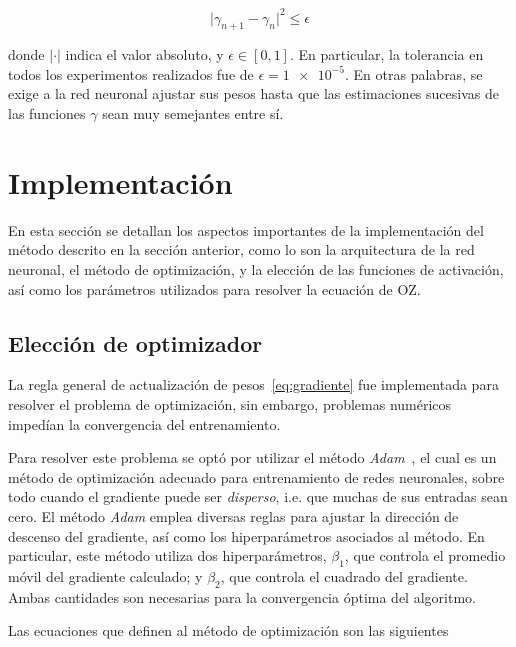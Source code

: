 \begin{equation}
    {\lvert \gamma_{n+1} - \gamma_{n} \rvert}^2 \leq \epsilon
    \label{eq:tolerancia}
\end{equation}

donde $\lvert \cdot \rvert$ indica el valor absoluto, y $\epsilon \in [0, 1]$.
En particular, la tolerancia en todos los experimentos realizados fue de
$\epsilon = \num{1e-5}$.
En otras palabras, se exige a la red neuronal ajustar sus pesos hasta que las estimaciones
sucesivas de las funciones $\gamma$ sean muy semejantes entre sí.

\section{Implementación}
En esta sección se detallan los aspectos importantes de la implementación del método
descrito en la sección anterior, como lo son la arquitectura de la red neuronal, el método
de optimización, y la elección de las funciones de activación, así como los parámetros
utilizados para resolver la ecuación de OZ.

\subsection{Elección de optimizador}
La regla general de actualización de pesos~\eqref{eq:gradiente} fue implementada para 
resolver el problema de optimización, sin embargo, problemas numéricos impedían la
convergencia del entrenamiento.

Para resolver este problema se optó por utilizar el método \emph{Adam}~\cite{kingmaAdamMethodStochastic2017},
el cual es un método de optimización adecuado para entrenamiento de redes neuronales,
sobre todo cuando el gradiente puede ser \emph{disperso}, i.e. que muchas de sus entradas
sean cero.
El método \emph{Adam} emplea diversas reglas para ajustar la dirección de descenso del
gradiente, así como los hiperparámetros asociados al método. En particular, este método
utiliza dos hiperparámetros, $\beta_1$, que controla el promedio móvil
del gradiente calculado; y $\beta_2$, que controla el cuadrado del gradiente. Ambas
cantidades son necesarias para la convergencia óptima del algoritmo.

Las ecuaciones que definen al método de optimización son las siguientes

